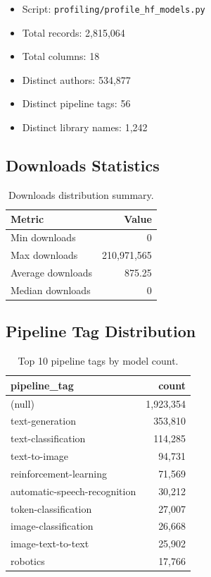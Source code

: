 \documentclass[11pt]{article}
\begin{document}
\begin{itemize}
  \item Script: \texttt{profiling/profile\_hf\_models.py}
  \item Total records: 2,815,064
  \item Total columns: 18
  \item Distinct authors: 534,877
  \item Distinct pipeline tags: 56
  \item Distinct library names: 1,242
\end{itemize}

\subsection{Downloads Statistics}

\begin{table}[H]
\centering
\begin{tabular}{lr}
\toprule
\textbf{Metric} & \textbf{Value} \\
\midrule
Min downloads     & 0 \\
Max downloads     & 210,971,565 \\
Average downloads & 875.25 \\
Median downloads  & 0 \\
\bottomrule
\end{tabular}
\caption{Downloads distribution summary.}
\end{table}

\subsection{Pipeline Tag Distribution}

\begin{table}[H]
\centering
\begin{tabular}{lr}
\toprule
\textbf{pipeline\_tag} & \textbf{count} \\
\midrule
(null)                          & 1,923,354 \\
text-generation                 & 353,810 \\
text-classification             & 114,285 \\
text-to-image                   & 94,731 \\
reinforcement-learning          & 71,569 \\
automatic-speech-recognition    & 30,212 \\
token-classification            & 27,007 \\
image-classification            & 26,668 \\
image-text-to-text              & 25,902 \\
robotics                        & 17,766 \\
\bottomrule
\end{tabular}
\caption{Top 10 pipeline tags by model count.}
\end{table}
\end{document}
